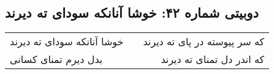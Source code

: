 \begin{center}
\section*{دوبیتی شماره ۴۲: خوشا آنانکه سودای ته دیرند}
\label{sec:042}
\begin{longtable}{l p{0.5cm} r}
خوشا آنانکه سودای ته دیرند
&&
که سر پیوسته در پای ته دیرند
\\
بدل دیرم تمنای کسانی
&&
که اندر دل تمنای ته دیرند
\\
\end{longtable}
\end{center}
